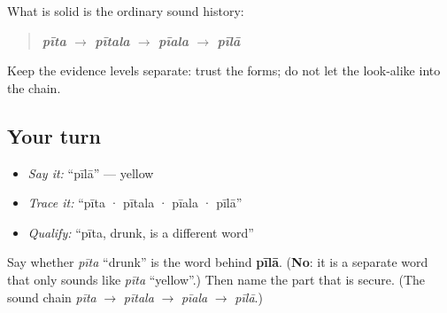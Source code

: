 What is solid is the ordinary sound history:

\begin{quote}
\textbf{\emph{pīta} $\to$ \emph{pītala} $\to$ \emph{pīala} $\to$ \emph{pīlā}}
\end{quote}

Keep the evidence levels separate: trust the forms; do not let the look-alike into the chain.

\subsection*{Your turn}
\begin{itemize}
\raggedright
  \item \emph{Say it:} \textquotedblleft{}pīlā\textquotedblright{} — yellow
  \item \emph{Trace it:} \textquotedblleft{}pīta · pītala · pīala · pīlā\textquotedblright{}
  \item \emph{Qualify:} \textquotedblleft{}pīta, drunk, is a different word\textquotedblright{}
\end{itemize}

\begin{tcolorbox}[breakable,colback=teal!4,colframe=teal!35!black,title={Before you move on}]
Say whether \emph{pīta} \textquotedblleft{}drunk\textquotedblright{} is the word behind \textbf{pīlā}. (\textbf{No}: it is a separate word that only sounds like \emph{pīta} \textquotedblleft{}yellow\textquotedblright{}.) Then name the part that is secure. (The sound chain \emph{pīta} $\to$ \emph{pītala} $\to$ \emph{pīala} $\to$ \emph{pīlā}.)
\end{tcolorbox}
